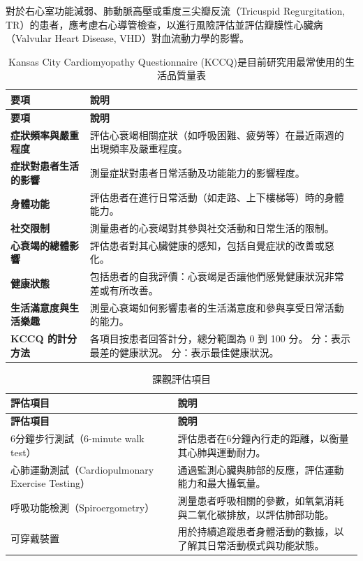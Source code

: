 \documentclass[nols]{tufte-book}
\begin{document}
對於右心室功能減弱、肺動脈高壓或重度三尖瓣反流（Tricuspid Regurgitation, TR）的患者，應考慮右心導管檢查，以進行風險評估並評估瓣膜性心臟病（Valvular Heart Disease, VHD）對血流動力學的影響。


\begin{longtable}{p{3cm} p{12cm}}
\caption{Kansas City Cardiomyopathy Questionnaire (KCCQ)是目前研究用最常使用的生活品質量表}
\label{table KCCQ}
\hline
\textbf{要項} & \textbf{說明} \\ \hline
\endfirsthead
\hline
\textbf{要項} & \textbf{說明} \\ \hline
\endhead
\hline
\endfoot

\textbf{症狀頻率與嚴重程度} & 評估心衰竭相關症狀（如呼吸困難、疲勞等）在最近兩週的出現頻率及嚴重程度。 \\ \hline
\textbf{症狀對患者生活的影響} & 測量症狀對患者日常活動及功能能力的影響程度。 \\ \hline
\textbf{身體功能} & 評估患者在進行日常活動（如走路、上下樓梯等）時的身體能力。 \\ \hline
\textbf{社交限制} & 測量患者的心衰竭對其參與社交活動和日常生活的限制。 \\ \hline
\textbf{心衰竭的總體影響} & 評估患者對其心臟健康的感知，包括自覺症狀的改善或惡化。 \\ \hline
\textbf{健康狀態} & 包括患者的自我評價：心衰竭是否讓他們感覺健康狀況非常差或有所改善。 \\ \hline
\textbf{生活滿意度與生活樂趣} & 測量心衰竭如何影響患者的生活滿意度和參與享受日常活動的能力。 \\ \hline
\textbf{KCCQ 的計分方法} & 各項目按患者回答計分，總分範圍為 0 到 100 分。\newline
0 分：表示最差的健康狀況。\newline
100 分：表示最佳健康狀況。 \\ \hline

\end{longtable}



\begin{longtable}{p{5cm} p{10cm}}
\caption{課觀評估項目}
\label{table objective evaluation}
\hline
\textbf{評估項目} & \textbf{說明} \\ \hline
\endfirsthead
\hline
\textbf{評估項目} & \textbf{說明} \\ \hline
\endhead
\hline
\endfoot

6分鐘步行測試（6-minute walk test） & 評估患者在6分鐘內行走的距離，以衡量其心肺與運動耐力。 \\ \hline
心肺運動測試（Cardiopulmonary Exercise Testing） & 通過監測心臟與肺部的反應，評估運動能力和最大攝氧量。 \\ \hline
呼吸功能檢測（Spiroergometry） & 測量患者呼吸相關的參數，如氧氣消耗與二氧化碳排放，以評估肺部功能。 \\ \hline
可穿戴裝置 & 用於持續追蹤患者身體活動的數據，以了解其日常活動模式與功能狀態。 \\ \hline

\end{longtable}
\end{document}
